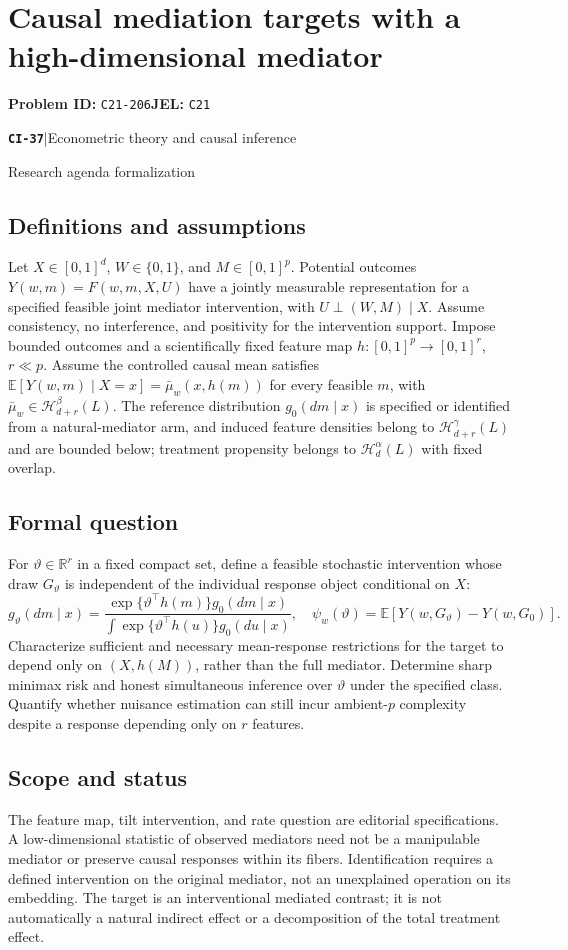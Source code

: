 \documentclass[11pt,a4paper]{article}
\newcommand{\R}{\mathbb R}
\newcommand{\E}{\mathbb E}
\newcommand{\entrymeta}[3]{{\sffamily\small\color{muted}\textbf{\texttt{#1}}\quad|\quad #2\par #3\par}}
\begin{document}
\section*{Causal mediation targets with a high-dimensional mediator}
\textbf{Problem ID:} \texttt{C21-206}\quad \textbf{JEL:} \texttt{C21}\par
\label{problem:OP-0516}
\label{beyond:CI-37}
\entrymeta{CI-37}{Econometric theory and causal inference}{Research agenda formalization}
\subsection*{Definitions and assumptions}
Let $X\in[0,1]^d$, $W\in\{0,1\}$, and $M\in[0,1]^p$. Potential outcomes $Y(w,m)=F(w,m,X,U)$ have a jointly measurable representation for a specified feasible joint mediator intervention, with $U\perp(W,M)\mid X$. Assume consistency, no interference, and positivity for the intervention support. Impose bounded outcomes and a scientifically fixed feature map $h:[0,1]^p\to[0,1]^r$, $r\ll p$. Assume the controlled causal mean satisfies $\E[Y(w,m)\mid X=x]=\bar\mu_w(x,h(m))$ for every feasible $m$, with $\bar\mu_w\in\mathcal H_{d+r}^\beta(L)$. The reference distribution $g_0(dm\mid x)$ is specified or identified from a natural-mediator arm, and induced feature densities belong to $\mathcal H_{d+r}^\gamma(L)$ and are bounded below; treatment propensity belongs to $\mathcal H_d^\alpha(L)$ with fixed overlap.
\subsection*{Formal question}
For $\vartheta\in\R^r$ in a fixed compact set, define a feasible stochastic intervention whose draw $G_\vartheta$ is independent of the individual response object conditional on $X$:
\[
 g_\vartheta(dm\mid x)=
 \frac{\exp\{\vartheta^\top h(m)\}g_0(dm\mid x)}
      {\int\exp\{\vartheta^\top h(u)\}g_0(du\mid x)},
 \quad \psi_w(\vartheta)=\E[Y(w,G_\vartheta)-Y(w,G_0)].
\]
Characterize sufficient and necessary mean-response restrictions for the target to depend only on $(X,h(M))$, rather than the full mediator. Determine sharp minimax risk and honest simultaneous inference over $\vartheta$ under the specified class. Quantify whether nuisance estimation can still incur ambient-$p$ complexity despite a response depending only on $r$ features.
\subsection*{Scope and status}
The feature map, tilt intervention, and rate question are editorial specifications. A low-dimensional statistic of observed mediators need not be a manipulable mediator or preserve causal responses within its fibers. Identification requires a defined intervention on the original mediator, not an unexplained operation on its embedding. The target is an interventional mediated contrast; it is not automatically a natural indirect effect or a decomposition of the total treatment effect.
\end{document}
